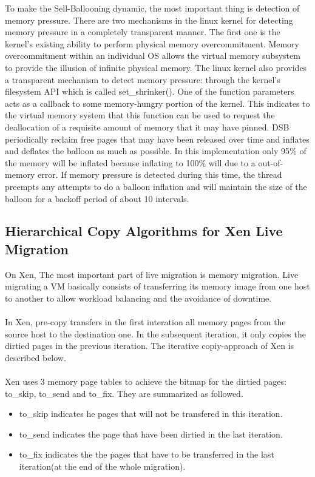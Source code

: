 \documentclass[runningheads]{llncs}
\begin{document}
To make the Sell-Ballooning dynamic, the most important thing is detection of memory pressure. There are two mechanisms in the linux kernel for detecting memory pressure in a completely transparent manner. The first one is the kernel's existing ability to perform physical memory overcommitment. Memory overcommitment within an individual OS allows the virtual memory subsystem to provide the illusion of infinite physical memory. The linux kernel also provides a transparent mechanism to detect memory pressure: through the kernel’s filesystem API which is called set\_shrinker(). One of the function parameters acts as a callback to some memory-hungry portion of the kernel. This indicates to the virtual memory system that this function can be used to request the deallocation of a requisite amount of memory that it may have pinned. DSB periodically reclaim free pages that may have been released over time and inflates and deflates the balloon as much as possible. In this implementation only 95\% of the memory will be inflated because inflating to 100\% will due to a out-of-memory error. If memory pressure is detected during this time, the thread preempts any attempts to do a balloon inflation and will maintain the size of the balloon for a backoff period of about 10 intervals.

\subsection{Hierarchical Copy Algorithms for Xen Live Migration}
On Xen, The most important part of live migration is memory migration. Live migrating a VM basically consists of transferring its memory image from one host to another to allow workload balancing and the avoidance of downtime\cite{xen2014wiki}.
\\\\
In Xen, pre-copy transfers in the first interation all memory pages from the source host to the destination one. In the subsequent iteration, it only copies the dirtied pages in the previous iteration. The iterative copiy-approach of Xen is described below.
\\\\
Xen uses 3 memory page tables to achieve the bitmap for the dirtied pages: to\_skip, to\_send and to\_fix. They are summarized as followed.

\begin{itemize}
\item to\_skip indicates he pages that will not be transfered in this iteration.
\item to\_send indicates the page that have been dirtied in the last iteration.
\item to\_fix indicates the the pages that have to be transferred in the last iteration(at the end of the whole migration).
\end{itemize}
\end{document}
